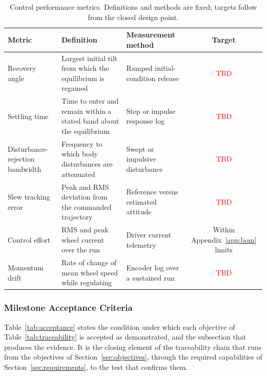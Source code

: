 \begin{table}[htbp]
\centering
\caption[Control performance metrics]{Control performance metrics. Definitions and methods are fixed;
targets follow from the closed design point.}
\label{tab:perf_metrics}
\small
\setlength{\tabcolsep}{4pt}
\begin{tabular}{L{2.8cm} L{4.7cm} L{4.1cm} c}
\toprule
Metric & Definition & Measurement method & Target \\
\midrule
Recovery angle & Largest initial tilt from which the equilibrium is regained & Ramped initial-condition release & \textcolor{red}{TBD} \\
Settling time & Time to enter and remain within a stated band about the equilibrium & Step or impulse response log & \textcolor{red}{TBD} \\
Disturbance-rejection bandwidth & Frequency to which body disturbances are attenuated & Swept or impulsive disturbance & \textcolor{red}{TBD} \\
Slew tracking error & Peak and RMS deviation from the commanded trajectory & Reference versus estimated attitude & \textcolor{red}{TBD} \\
Control effort & RMS and peak wheel current over the run & Driver current telemetry & Within Appendix~\ref{app:bom} limits \\
Momentum drift & Rate of change of mean wheel speed while regulating & Encoder log over a sustained run & \textcolor{red}{TBD} \\
\bottomrule
\end{tabular}
\end{table}

\subsubsection{Milestone Acceptance Criteria}
\label{sec:test_acceptance}

Table~\ref{tab:acceptance} states the condition under which each objective of
Table~\ref{tab:traceability} is accepted as demonstrated, and the subsection that
produces the evidence. It is the closing element of the traceability chain that
runs from the objectives of Section~\ref{sec:objectives}, through the required
capabilities of Section~\ref{sec:requirements}, to the test that confirms them.

